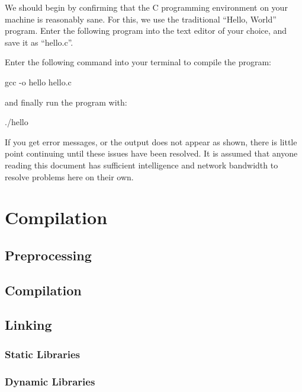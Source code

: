 \documentclass[a4paper,10pt]{report}
\newcommand{\drmcode}[3]{\begin{minipage}{\columnwidth}\end{minipage}}
\newcommand{\ccode}[2]{\drmcode{C}{#1}{#2.c}}
\begin{document}
We should begin by confirming that the C programming environment on
your machine is reasonably sane. For this, we use the traditional
``Hello, World'' program. Enter the following program into the text
editor of your choice, and save it as ``hello.c''.

\ccode{\texttt{hello.c}}{hello}

\noindent
Enter the following command into your terminal to compile
the program:

gcc -o hello hello.c
\END

\noindent
and finally run the program with:

./hello
\END

\noindent{}
If you get error messages, or the output does not appear as shown,
there is little point continuing until these issues have been
resolved. It is assumed that anyone reading this document has
sufficient intelligence and network bandwidth to resolve problems here
on their own.

\chapter{Compilation}

\section{Preprocessing}

\section{Compilation}

\section{Linking}

\subsection{Static Libraries}

\subsection{Dynamic Libraries}

\section{\toolmake}
\end{document}
